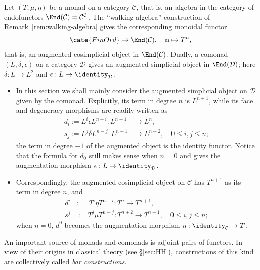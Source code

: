 \begin{example}\label{eg:monad-simplicial}
	Let $(T,\mu,\eta)$ be a monad on a category $\mathcal{C}$, that is, an
	algebra in the category of endofunctors
	$\End(\mathcal{C})=\mathcal{C}^{\mathcal{C}}$. The ``walking algebra''
	construction of Remark~\ref{rem:walking-algebra} gives the corresponding
	monoidal functor
	\[ \cate{FinOrd} \to \End(\mathcal{C}), \quad \mathbf{n} \mapsto T^n , \]
	that is, an augmented cosimplicial object in $\End(\mathcal{C})$. Dually,
	a comonad $(L,\delta,\epsilon)$ on a category $\mathcal{D}$ gives an
	augmented simplicial object in $\End(\mathcal{D})$; here
	$\delta:L\to L^2$ and $\epsilon:L\to\identity_{\mathcal{D}}$.

	\begin{itemize}
		\item In this section we shall mainly consider the augmented simplicial
		object on $\mathcal{D}$ given by the comonad. Explicitly, its term in
		degree $n$ is $L^{n+1}$, while its face and degeneracy morphisms are
		readily written as
		\begin{align*}
			d_i := L^i \epsilon L^{n-i}: L^{n+1} & \to L^n, \\
			s_j := L^j \delta L^{n-j}: L^{n+1} & \to L^{n+2}, \quad 0 \leq i, j \leq n ;
		\end{align*}
		the term in degree $-1$ of the augmented object is the identity
		functor. Notice that the formula for $d_0$ still makes sense when
		$n=0$ and gives the augmentation morphism
		$\epsilon:L\to\identity_{\mathcal{D}}$.

		\item Correspondingly, the augmented cosimplicial object on
		$\mathcal{C}$ has $T^{n+1}$ as its term in degree $n$, and
		\begin{align*}
			d^i & : = T^i \eta T^{n-i}: T^n \to T^{n+1}, \\
			s^j & := T^j \mu T^{n-j}: T^{n+2} \to T^{n+1}, \quad 0 \leq i, j \leq n ;
		\end{align*}
		when $n=0$, $d^0$ becomes the augmentation morphism
		$\eta:\identity_{\mathcal{C}}\to T$.
	\end{itemize}
\end{example}

An important source of monads and comonads is adjoint pairs of functors. In
view of their origins in classical theory (see \S\ref{sec:HH}), constructions
of this kind are collectively called \emph{bar constructions}.

